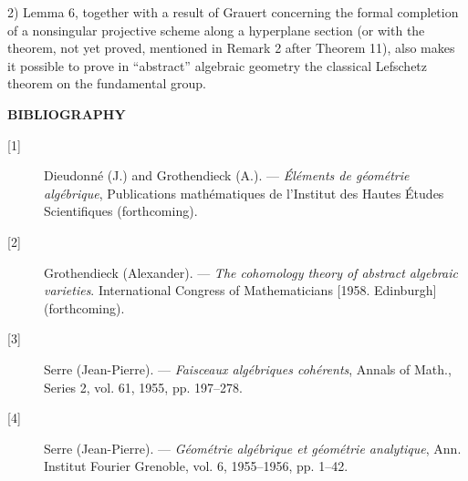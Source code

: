 2) Lemma 6, together with a result of Grauert concerning the formal completion
of a nonsingular projective scheme along a hyperplane section (or with the
theorem, not yet proved, mentioned in Remark 2 after Theorem 11), also makes it
possible to prove in “abstract” algebraic geometry the classical Lefschetz
theorem on the fundamental group.

\begin{center}
  \textbf{BIBLIOGRAPHY}
\end{center}

\begin{description}
  \item[{[1]}] Dieudonné (J.) and Grothendieck (A.). --- \emph{Éléments de
    géométrie algébrique}, Publications mathématiques de l'Institut des Hautes
    Études Scientifiques (forthcoming).
  \item[{[2]}] Grothendieck (Alexander). --- \emph{The cohomology theory of
    abstract algebraic varieties}. International Congress of Mathematicians
    [1958. Edinburgh] (forthcoming).
  \item[{[3]}] Serre (Jean-Pierre). --- \emph{Faisceaux algébriques
    cohérents}, Annals of Math., Series 2, vol. 61, 1955, pp. 197--278.
  \item[{[4]}] Serre (Jean-Pierre). --- \emph{Géométrie algébrique et
    géométrie analytique}, Ann. Institut Fourier Grenoble, vol. 6, 1955--1956,
    pp. 1--42.
\end{description}

\par\smallskip
\begingroup\footnotesize
\endgroup
